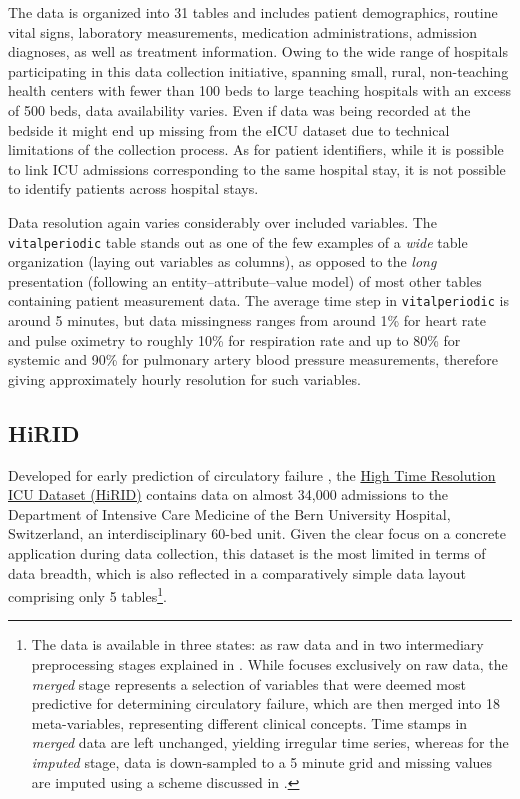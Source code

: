 \documentclass[
  notitle,
  nojss,
  noheadings]{jss}
\begin{document}
The data is organized into 31 tables and includes patient demographics,
routine vital signs, laboratory measurements, medication
administrations, admission diagnoses, as well as treatment information.
Owing to the wide range of hospitals participating in this data
collection initiative, spanning small, rural, non-teaching health
centers with fewer than 100 beds to large teaching hospitals with an
excess of 500 beds, data availability varies. Even if data was being
recorded at the bedside it might end up missing from the eICU dataset
due to technical limitations of the collection process. As for patient
identifiers, while it is possible to link ICU admissions corresponding
to the same hospital stay, it is not possible to identify patients
across hospital stays.

Data resolution again varies considerably over included variables. The
\texttt{vitalperiodic} table stands out as one of the few examples of a
\emph{wide} table organization (laying out variables as columns), as
opposed to the \emph{long} presentation (following an
entity--attribute--value model) of most other tables containing patient
measurement data. The average time step in \texttt{vitalperiodic} is
around 5 minutes, but data missingness ranges from around 1\% for heart
rate and pulse oximetry to roughly 10\% for respiration rate and up to
80\% for systemic and 90\% for pulmonary artery blood pressure
measurements, therefore giving approximately hourly resolution for such
variables.

\hypertarget{hirid}{%
\subsection{HiRID}\label{hirid}}

Developed for early prediction of circulatory failure
\citep{hyland2020}, the
\href{https://physionet.org/content/hirid/1.0/}{High Time Resolution ICU
Dataset (HiRID)} contains data on almost 34,000 admissions to the
Department of Intensive Care Medicine of the Bern University Hospital,
Switzerland, an interdisciplinary 60-bed unit. Given the clear focus on
a concrete application during data collection, this dataset is the most
limited in terms of data breadth, which is also reflected in a
comparatively simple data layout comprising only 5 tables\footnote{The
  data is available in three states: as raw data and in two intermediary
  preprocessing stages explained in \cite{hyland2020}. While 
  focuses exclusively on raw data, the \emph{merged} stage represents a
  selection of variables that were deemed most predictive for
  determining circulatory failure, which are then merged into 18
  meta-variables, representing different clinical concepts. Time stamps
  in \emph{merged} data are left unchanged, yielding irregular time
  series, whereas for the \emph{imputed} stage, data is down-sampled to
  a 5 minute grid and missing values are imputed using a scheme
  discussed in \cite{hyland2020}.}.
\end{document}
